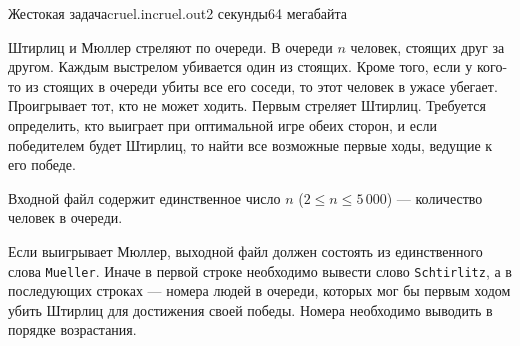 \begin{problem}{Жестокая задача}{cruel.in}{cruel.out}{2 секунды}{64 мегабайта}

Штирлиц и Мюллер стреляют по очереди. В очереди $n$ человек, стоящих друг за 
другом. Каждым выстрелом убивается один из стоящих. Кроме того, если у 
кого-то из стоящих в очереди убиты все его соседи, то этот человек в ужасе 
убегает. Проигрывает тот, кто не может ходить. Первым стреляет Штирлиц. 
Требуется определить, кто выиграет при оптимальной игре обеих сторон, и если 
победителем будет Штирлиц, то найти все возможные первые ходы, ведущие к его 
победе.

\InputFile

Входной файл содержит единственное число $n$ ($2\le n\le 5\,000$) --- 
количество человек в очереди.

\OutputFile

Если выигрывает Мюллер, выходной файл должен состоять из единственного слова 
\texttt{Mueller}. Иначе в первой строке необходимо вывести 
слово \texttt{Schtirlitz}, а в последующих строках --- номера людей в очереди, 
которых мог бы первым ходом убить Штирлиц для достижения своей победы. Номера 
необходимо выводить в порядке возрастания.

\Example

\begin{example}
%
\end{example}

\end{problem}
